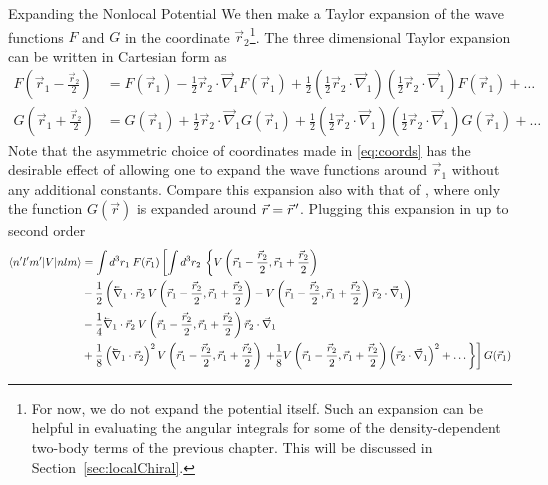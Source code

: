 \begin{section}{Expanding the Nonlocal Potential}
We then make a Taylor expansion of the wave functions $F$ and $G$ in the coordinate $\vec{r}_2$\footnote{For now, we do not expand the potential itself. Such an expansion can be helpful in evaluating the angular integrals for some of the density-dependent two-body terms of the previous chapter. This will be discussed in Section~\ref{sec:localChiral}.}. The three dimensional Taylor expansion can be written in Cartesian form as
\begin{align}\label{eq:TaylorExpansion}
F\left(\vec{r}_1-\frac{\vec{r}_2}{2}\right)&=F(\vec{r}_1)-\frac{1}{2}\vec{r}_2\cdot\vec{\nabla}_1 F(\vec{r}_1)+\frac{1}{2}\left(\frac{1}{2}\vec{r}_2\cdot\vec{\nabla}_1\right)\left(\frac{1}{2}\vec{r}_2\cdot\vec{\nabla}_1\right)F(\vec{r}_1)+\dots 
\\
G\left(\vec{r}_1+\frac{\vec{r}_2}{2}\right)&=G(\vec{r}_1)+\frac{1}{2}\vec{r}_2\cdot\vec{\nabla}_1 G(\vec{r}_1)+\frac{1}{2}\left(\frac{1}{2}\vec{r}_2\cdot\vec{\nabla}_1\right)\left(\frac{1}{2}\vec{r}_2\cdot\vec{\nabla}_1\right)G(\vec{r}_1)+\dots
\end{align}
Note that the asymmetric choice of coordinates made in \eqref{eq:coords} has the desirable effect of allowing one to expand the wave functions around $\vec{r}_1$ without any additional constants. Compare this expansion also with that of \cite{0954-3899-26-3-310}, where only the function $G(\vec{r})$ is expanded around $\vec{r}=\vec{r}\mkern2mu'$. Plugging this expansion in up to second order 
\begin{equation}\label{eq:expansionCartesian}
\begin{split}
\braket{n' l' m'| V | n l m} &= \int d^3r_1\: F(\vec{r}_1)\left[\int d^3r_2\:\left\{V\left(\vec{r}_1-\frac{\vec{r}_2}{2},\vec{r}_1+\frac{\vec{r}_2}{2}\right) \right.\right. \\
&-\frac{1}{2} \left(\lvec{\nabla}_1\cdot\vec{r}_2\: V\left(\vec{r}_1-\frac{\vec{r}_2}{2},\vec{r}_1+\frac{\vec{r}_2}{2}\right) -
V\left(\vec{r}_1-\frac{\vec{r}_2}{2},\vec{r}_1+\frac{\vec{r}_2}{2}\right) \vec{r}_2\cdot\vec{\nabla}_1
\right)\\
&-\frac{1}{4}\lvec{\nabla}_1\cdot\vec{r}_2\: V\left(\vec{r}_1-\frac{\vec{r}_2}{2},\vec{r}_1+\frac{\vec{r}_2}{2}\right) \vec{r}_2\cdot\vec{\nabla}_1\\
&+\frac{1}{8}\left(\lvec{\nabla}_{1}\cdot\vec{r}_2\right)^2 V\left(\vec{r}_1-\frac{\vec{r}_2}{2},\vec{r}_1+\frac{\vec{r}_2}{2}\right) 
\left.\left.+\frac{1}{8} V\left(\vec{r}_1-\frac{\vec{r}_2}{2},\vec{r}_1+\frac{\vec{r}_2}{2}\right) \left(\vec{r}_2\cdot\vec{\nabla}_{1}\right)^2+\dots \right\}\right]G(\vec{r}_1)
\end{split}
\end{equation}


\end{section}

